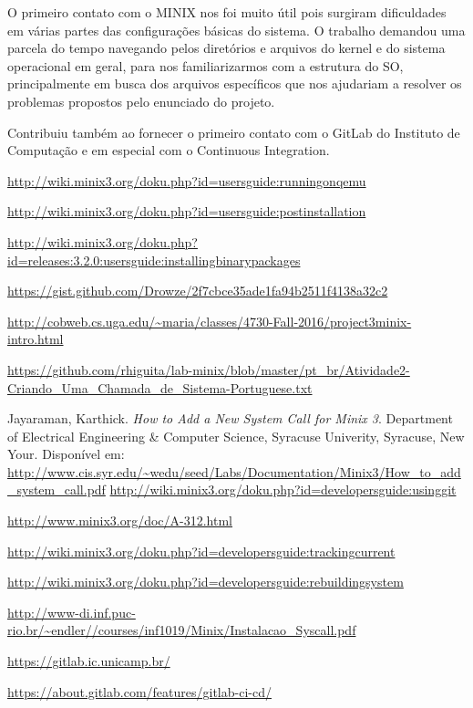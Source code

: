 \documentclass[12pt,journal,compsoc]{IEEEtran}
\begin{document}
O primeiro contato com o MINIX nos foi muito útil pois surgiram dificuldades em várias partes das configura\c{c}ões básicas do sistema.
O trabalho demandou uma parcela do tempo navegando pelos diretórios e arquivos do kernel e do sistema operacional em geral, para nos familiarizarmos com a estrutura do SO, principalmente em busca dos arquivos específicos que nos ajudariam a resolver os problemas propostos pelo enunciado do projeto.

Contribuiu também ao fornecer o primeiro contato com o GitLab do Instituto de Computa\c{c}ão\cite{repositorioIC:gitLab} e em especial com o Continuous Integration\cite{gitLabCI:gitLab}.

\renewcommand\refname{Referências}
\begin{thebibliography}{1}

\url{http://wiki.minix3.org/doku.php?id=usersguide:runningonqemu}

\url{http://wiki.minix3.org/doku.php?id=usersguide:postinstallation}

\url{http://wiki.minix3.org/doku.php?id=releases:3.2.0:usersguide:installingbinarypackages}

\url{https://gist.github.com/Drowze/2f7cbce35ade1fa94b2511f4138a32c2}

\url{http://cobweb.cs.uga.edu/~maria/classes/4730-Fall-2016/project3minix-intro.html}

\url{https://github.com/rhiguita/lab-minix/blob/master/pt\_br/Atividade2-Criando\_Uma\_Chamada\_de\_Sistema-Portuguese.txt}

Jayaraman, Karthick. \textit{How to Add a New System Call for Minix 3}. Department of Electrical Engineering \& Computer Science, Syracuse Univerity, Syracuse, New Your. Dispon\'ivel em: \url{http://www.cis.syr.edu/~wedu/seed/Labs/Documentation/Minix3/How_to_add_system_call.pdf}
\url{http://wiki.minix3.org/doku.php?id=developersguide:usinggit}

\url{http://www.minix3.org/doc/A-312.html}

\url{http://wiki.minix3.org/doku.php?id=developersguide:trackingcurrent }

\url{http://wiki.minix3.org/doku.php?id=developersguide:rebuildingsystem}

\url{http://www-di.inf.puc-rio.br/~endler//courses/inf1019/Minix/Instalacao_Syscall.pdf}

\url{https://gitlab.ic.unicamp.br/}

\url{https://about.gitlab.com/features/gitlab-ci-cd/}

\end{thebibliography}
\end{document}
